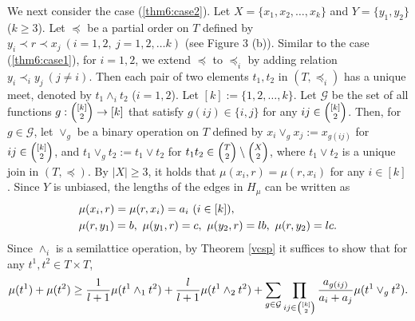 \documentclass[11pt]{article}
\theoremstyle{definition}
\begin{document}
We next consider the case (\ref{thm6:case2}). Let $X=\{x_1,x_2,\ldots,x_k\}$ and $Y=\{y_1,y_2\}$ ($k\geq 3$). Let $\preceq$ be a partial order on $T$ defined by $y_i\prec r\prec x_j\ (i=1,2,\ j=1,2,\ldots k)$ (see Figure 3 (b)). Similar to the case (\ref{thm6:case1}), for $i=1,2$, we extend $\preceq$ to $\preceq_i$ by adding relation $y_i \prec_i y_j\ (j\neq i)$. Then each pair of two elements $t_1,t_2$ in $(T,\preceq_i)$ has a unique meet, denoted by $t_1\wedge_i t_2$ ($i=1,2$). Let $[k]:=\{1,2,\ldots,k\}$. Let $\mathcal{G}$ be the set of all functions $g:{\scriptsize\begin{pmatrix}[k] \\
                     2 \\
      \end{pmatrix}}\rightarrow [k]$
that satisfy $g(ij)\in \{i,j\}$ for any $ij\in {\scriptsize\begin{pmatrix}[k] \\
                     2 \\
      \end{pmatrix}}$. 
Then, for $g\in \mathcal{G}$, let $\vee_g$ be a binary operation on $T$ defined by $x_i\vee_g x_j:=x_{g(ij)}$ for $ij\in {\scriptsize\begin{pmatrix}[k] \\
                     2 \\
\end{pmatrix}}$, and $t_1\vee_g t_2:=t_1\vee t_2$ for $t_{1}t_2\in {\scriptsize\begin{pmatrix}T \\
                     2 \\
      \end{pmatrix}}\setminus {\scriptsize\begin{pmatrix}X \\
                     2 \\
\end{pmatrix}}$, where $t_1\vee t_2$ is a unique join in $(T,\preceq)$. By $|X|\geq 3$, it holds that $\mu(x_i,r)=\mu(r,x_i)$ for any $i\in [k]$. Since $Y$ is unbiased, the lengths of the edges in $H_\mu$ can be written as
\begin{align}
    &\mu(x_i,r)=\mu(r,x_i)=a_i\ (i\in [k]),\notag\\
    &\mu(r,y_1)=b,\ \mu(y_1,r)=c,\ \mu(y_2,r)=lb,\ \mu(r,y_2)=lc.
\end{align}
Since $\wedge_i$ is a semilattice operation, by Theorem \ref{vcsp} it suffices to show that for any $t^1,t^2\in T\times T$,
\begin{align}
\label{vcspcondition:case2}
    \mu(t^1)+\mu(t^2)\geq \frac{1}{l+1}\mu(t^1\wedge_1 t^2)+\frac{l}{l+1}\mu(t^1\wedge_2 t^2)+\sum_{g\in \mathcal{G}}\prod_{\tiny ij\in
\begin{pmatrix}
[k] \\
2 \\
\end{pmatrix}\normalsize}\frac{a_{g(ij)}}{a_i+a_j}\mu(t^1\vee_g t^2).
\end{align}
\end{document}
